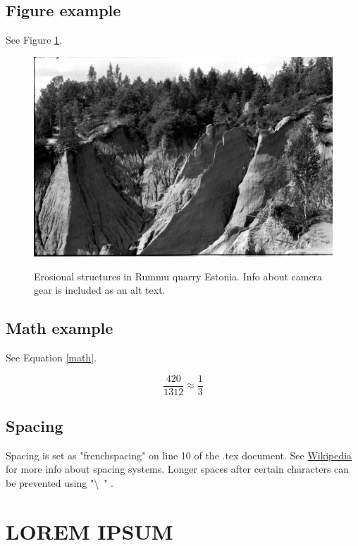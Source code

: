 \documentclass[12pt]{article}%
\begin{document}
\subsection{Figure example}
See Figure \ref{example}. 
\begin{figure}[h]
\includegraphics[alt={Olympus OM-10, Fomapan 200}, width=\linewidth]{example.jpg}
\caption{Erosional structures in Rummu quarry Estonia. Info about camera gear is included as an alt text.}
\label{example}
\end{figure}

\subsection{Math example}
See Equation \ref{math}.

\begin{equation}
\frac{420}{1312}\approx \frac13
\label{math}
\end{equation}

\subsection{Spacing}
Spacing is set as "frenchspacing" on line 10 of the .tex document. See \href{https://en.wikipedia.org/wiki/History_of_sentence_spacing}{Wikipedia} for more info about spacing systems. Longer spaces after certain characters can be prevented using "\textbackslash\ " . %

\section{LOREM IPSUM}
\end{document}
